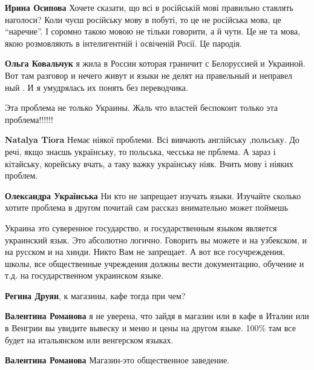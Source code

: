 \begin{itemize}
{\begin{itemize}
\textbf{Ирина Осипова} Хочете сказати, що всі в російській мові правильно ставлять
наголоси? Коли чуєш російську мову в побуті, то це не російська мова, це
\enquote{наречие}. І соромно такою мовою не тільки говорити, а й чути. Це не та мова,
якою розмовляють в інтелигентній і освіченій Росії. Це пародія.


\textbf{Ольга Ковальчук} я жила в России которая граничит с Белоруссией и Украиной. Вот
там разговор и нечего живут и языки не делят на правельный и неправел ный . И я
умудрялась их понять без переводчика.

\end{itemize}


Эта проблема не только Украины. Жаль что властей беспокоит только эта проблема!!!!!!

\begin{itemize}
\textbf{Natalya Tiora} Немає ніякої проблеми. Всі вивчають англійську
,польську. До речі, якщо знаєшь українську, то польська, чесська не прблема. А
зараз і кітайську, корейську вчать, а таку важку українську ніяк. Вчить мову і
ніяких проблем.

\textbf{Олександра Українська} 
Ни кто не запрещает изучать языки. Изучайте сколько хотите
проблема в другом почитай сам рассказ внимательно может поймешь
\end{itemize}


Украина это суверенное государство, и государственным языком является
украинский язык. Это абсолютно логично. Говорить вы можете и на узбекском, и на
русском и на хинди. Никто Вам не запрещает. А вот все госучреждения, школы, все
общественные учреждения должны вести документацию, обучение и т.д. на
государственном украинском языке.

\begin{itemize}
\textbf{Регина Друян}, к магазины, кафе тогда при чем?


\textbf{Валентина Романова} я не уверена, что зайдя в магазин или в кафе в
Италии или в Венгрии вы увидите вывеску и меню и цены на другом языке. 100\% там
все будет на итальянском или венгерском языках.

\textbf{Валентина Романова} Магазин-это общественное заведение.


\end{itemize}}
\end{itemize}

